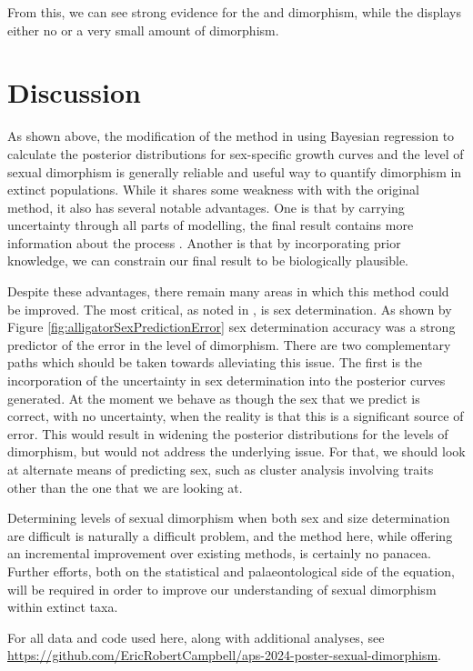 \documentclass[letterpaper]{article}
\begin{document}
From this, we can see strong evidence for the \maia{} and \psit{} dimorphism, while the \tyran{} displays either no or a very small amount of dimorphism.

\section{Discussion}

As shown above, the modification of the method in \cite{saittaEffectSizeStatistical2020} using Bayesian regression to calculate the posterior distributions for sex-specific growth curves and the level of sexual dimorphism is generally reliable and useful way to quantify dimorphism in extinct populations. While it shares some weakness with with the original method, it also has several notable advantages. One is that by carrying uncertainty through all parts of modelling, the final result contains more information about the process \parencite{mcelreathStatisticalRethinkingBayesian2020}. Another is that by incorporating prior knowledge, we can constrain our final result to be biologically plausible.

Despite these advantages, there remain many areas in which this method could be improved. The most critical, as noted in \cite{saittaEffectSizeStatistical2020}, is sex determination. As shown by Figure \ref{fig:alligatorSexPredictionError} sex determination accuracy was a strong predictor of the error in the level of dimorphism. There are two complementary paths which should be taken towards alleviating this issue. The first is the incorporation of the uncertainty in sex determination into the posterior curves generated. At the moment we behave as though the sex that we predict is correct, with no uncertainty, when the reality is that this is a significant source of error. This would result in widening the posterior distributions for the levels of dimorphism, but would not address the underlying issue. For that, we should look at alternate means of predicting sex, such as cluster analysis involving traits other than the one that we are looking at.

Determining levels of sexual dimorphism when both sex and size determination are difficult is naturally a difficult problem, and the method here, while offering an incremental improvement over existing methods, is certainly no panacea. Further efforts, both on the statistical and palaeontological side of the equation, will be required in order to improve our understanding of sexual dimorphism within extinct taxa.


\printbibliography[title=Bibliography]
For all data and code used here, along with additional analyses, see \url{https://github.com/EricRobertCampbell/aps-2024-poster-sexual-dimorphism}.
\end{document}
